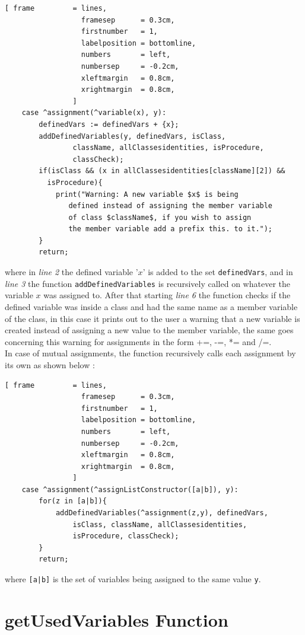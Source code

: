 \documentclass[11pt]{report}
\begin{document}
\begin{Verbatim}[ frame         = lines, 
                  framesep      = 0.3cm, 
                  firstnumber   = 1,
                  labelposition = bottomline,
                  numbers       = left,
                  numbersep     = -0.2cm,
                  xleftmargin   = 0.8cm,
                  xrightmargin  = 0.8cm,
                ]
    case ^assignment(^variable(x), y):
		definedVars := definedVars + {x};
		addDefinedVariables(y, definedVars, isClass,
		        className, allClassesidentities, isProcedure,
		        classCheck);
		if(isClass && (x in allClassesidentities[className][2]) && 
		  isProcedure){
			print("Warning: A new variable $x$ is being
			   defined instead of assigning the member variable 
			   of class $className$, if you wish to assign
			   the member variable add a prefix this. to it.");
		}
		return;
\end{Verbatim}
where in \textsl{line 2} the defined variable '$x$' is added to the set \texttt{definedVars}, and in \textsl{line 3} the function \texttt{addDefinedVariables} is recursively called on whatever the variable $x$ was assigned to. After that starting \textsl{line 6} the function checks if the defined variable was inside a class and had the same name as a member variable of the class, in this case it prints out to the user a warning that a new variable is created instead of assigning a new value to the member variable, the same goes concerning this warning for assignments in the form +=, -=, *= and /=.
\\

In case of mutual assignments, the function recursively calls each assignment by its own as shown below :

\begin{Verbatim}[ frame         = lines, 
                  framesep      = 0.3cm, 
                  firstnumber   = 1,
                  labelposition = bottomline,
                  numbers       = left,
                  numbersep     = -0.2cm,
                  xleftmargin   = 0.8cm,
                  xrightmargin  = 0.8cm,
                ]
    case ^assignment(^assignListConstructor([a|b]), y):
		for(z in [a|b]){
			addDefinedVariables(^assignment(z,y), definedVars,
			    isClass, className, allClassesidentities, 
			    isProcedure, classCheck);
		}
		return;
\end{Verbatim}
where \texttt{[a|b]} is the set of variables being assigned to the same value \texttt{y}.

\section{getUsedVariables Function}
\end{document}
